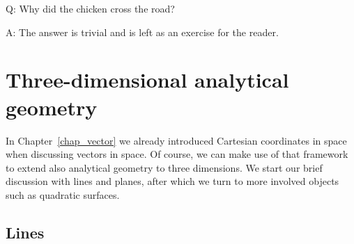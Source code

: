 \begin{savequote}[75mm]
Q: Why did the chicken cross the road?

A: The answer is trivial and is left as an exercise for the reader.
\end{savequote}

\chapter{Three-dimensional analytical geometry}
\label{chap_ana_geo}
\graphicspath{{figures/Ana_Geo/}}

In Chapter~\ref{chap_vector} we already introduced Cartesian coordinates in space when discussing vectors in space. Of course, we can make use of that framework to extend also analytical geometry to three dimensions. We start our brief discussion with lines and planes, after which we turn to more involved objects such as quadratic surfaces. 

\section{Lines}\label{sec:lines}

